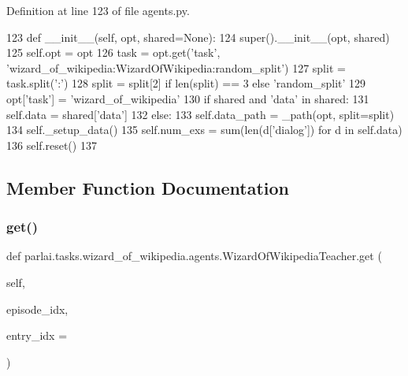 Definition at line 123 of file agents.\+py.


\begin{DoxyCode}
123     \textcolor{keyword}{def }\_\_init\_\_(self, opt, shared=None):
124         super().\_\_init\_\_(opt, shared)
125         self.opt = opt
126         task = opt.get(\textcolor{stringliteral}{'task'}, \textcolor{stringliteral}{'wizard\_of\_wikipedia:WizardOfWikipedia:random\_split'})
127         split = task.split(\textcolor{stringliteral}{':'})
128         split = split[2] \textcolor{keywordflow}{if} len(split) == 3 \textcolor{keywordflow}{else} \textcolor{stringliteral}{'random\_split'}
129         opt[\textcolor{stringliteral}{'task'}] = \textcolor{stringliteral}{'wizard\_of\_wikipedia'}
130         \textcolor{keywordflow}{if} shared \textcolor{keywordflow}{and} \textcolor{stringliteral}{'data'} \textcolor{keywordflow}{in} shared:
131             self.data = shared[\textcolor{stringliteral}{'data'}]
132         \textcolor{keywordflow}{else}:
133             self.data\_path = \_path(opt, split=split)
134             self.\_setup\_data()
135         self.num\_exs = sum(len(d[\textcolor{stringliteral}{'dialog'}]) \textcolor{keywordflow}{for} d \textcolor{keywordflow}{in} self.data)
136         self.reset()
137 
\end{DoxyCode}


\subsection{Member Function Documentation}
\mbox{\label{classparlai_1_1tasks_1_1wizard__of__wikipedia_1_1agents_1_1WizardOfWikipediaTeacher_acf1161101f1d7d03017da25f976488d6}} 
\subsubsection{\texorpdfstring{get()}{get()}}
{\footnotesize\ttfamily def parlai.\+tasks.\+wizard\+\_\+of\+\_\+wikipedia.\+agents.\+Wizard\+Of\+Wikipedia\+Teacher.\+get (\begin{DoxyParamCaption}\item[{}]{self,  }\item[{}]{episode\+\_\+idx,  }\item[{}]{entry\+\_\+idx = {} }\end{DoxyParamCaption})}



